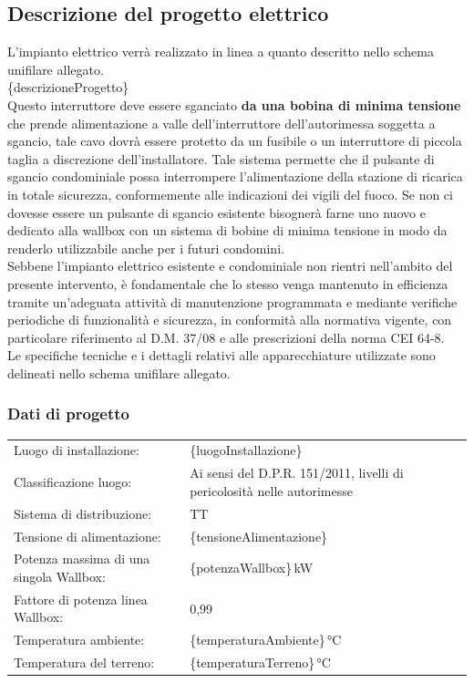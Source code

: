\subsection{Descrizione del progetto elettrico}
L’impianto elettrico verrà realizzato in linea a quanto descritto nello schema unifilare allegato. \\
\{descrizioneProgetto\} \\
Questo interruttore deve essere sganciato \textbf{da una bobina di minima tensione} che prende alimentazione a valle dell’interruttore dell’autorimessa soggetta a sgancio, tale cavo dovrà essere protetto da un fusibile o un interruttore di piccola taglia a discrezione dell'installatore. Tale sistema permette che il pulsante di sgancio condominiale possa interrompere l'alimentazione della stazione di ricarica in totale sicurezza, conformemente alle indicazioni dei vigili del fuoco. Se non ci dovesse essere un pulsante di sgancio esistente bisognerà farne uno nuovo e dedicato alla wallbox con un sistema di bobine di minima tensione in modo da renderlo utilizzabile anche per i futuri condomini. \\
Sebbene l’impianto elettrico esistente e condominiale non rientri nell’ambito del presente intervento, è fondamentale che lo stesso venga mantenuto in efficienza tramite un’adeguata attività di manutenzione programmata e mediante verifiche periodiche di funzionalità e sicurezza, in conformità alla normativa vigente, con particolare riferimento al D.M. 37/08 e alle prescrizioni della norma CEI 64-8. \\
Le specifiche tecniche e i dettagli relativi alle apparecchiature utilizzate sono delineati nello schema unifilare allegato.

\subsubsection{Dati di progetto}
\begin{center}
\begin{tabularx}{\textwidth}{lX}
Luogo di installazione:              & \{luogoInstallazione\} \\
Classificazione luogo:               & Ai sensi del D.P.R. 151/2011, livelli di pericolosità nelle autorimesse \\
Sistema di distribuzione:            & TT \\
Tensione di alimentazione:           & \{tensioneAlimentazione\} \\
Potenza massima di una singola Wallbox: & \{potenzaWallbox\}\,kW \\
Fattore di potenza linea Wallbox:    & 0,99 \\
Temperatura ambiente:                & \{temperaturaAmbiente\}\,°C \\
Temperatura del terreno:             & \{temperaturaTerreno\}\,°C \\
\end{tabularx}
\end{center}

